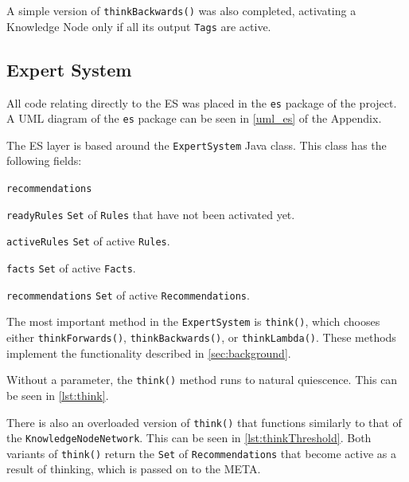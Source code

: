 \documentclass[titlepage,11pt]{article}
\def \espath {"/Users/seanstappas1/GitHub/prometheus-ai/es/ExpertSystem.java"}
\def \knnpath {"/Users/seanstappas1/GitHub/prometheus-ai/knn/KnowledgeNodeNetwork.java"}
\newcommand{\ar}[1]{\autoref{#1}}
\newcommand{\code}[1]{\texttt{#1}}
\begin{document}


A simple version of \code{thinkBackwards()} was also completed, activating a Knowledge Node only if all its output \code{Tags} are active.

\subsection{Expert System}

All code relating directly to the ES was placed in the \code{es} package of the project. A UML diagram of the \code{es} package can be seen in \autoref{uml_es} of the Appendix.

The ES layer is based around the \code{ExpertSystem} Java class. This class has the following fields:

\begin{labeling}{\code{recommendations}}
	\item[\code{readyRules}] \code{Set} of \code{Rules} that have not been activated yet.
	\item[\code{activeRules}] \code{Set} of active \code{Rules}.
	\item[\code{facts}] \code{Set} of active \code{Facts}.
	\item[\code{recommendations}] \code{Set} of active \code{Recommendations}.
\end{labeling}

The most important method in the \code{ExpertSystem} is \code{think()}, which chooses either \code{thinkForwards()}, \code{thinkBackwards()}, or \code{thinkLambda()}. These methods implement the functionality described in \ar{sec:background}.

Without a parameter, the \code{think()} method runs to natural quiescence. This can be seen in \autoref{lst:think}.



There is also an overloaded version of \code{think()} that functions similarly to that of the \code{KnowledgeNodeNetwork}. This can be seen in \autoref{lst:thinkThreshold}. Both variants of \code{think()} return the \code{Set} of \code{Recommendations} that become active as a result of thinking, which is passed on to the META.


\end{document}
